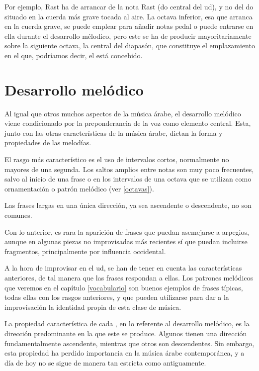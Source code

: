 Por ejemplo, \maqam Rast ha de arrancar de la nota Rast (do central del ud), y no del do situado en la cuerda más grave tocada al aire. La octava inferior, esa que arranca en la cuerda grave, se puede emplear para añadir notas pedal o puede entrarse en ella durante el desarrollo mélodico, pero este se ha de producir mayoritariamente sobre la siguiente octava, la central del diapasón, que constituye el emplazamiento en el que, podríamos decir, el \maqam está concebido.

\section{Desarrollo melódico}
\label{desarrollo_melodico}

Al igual que otros muchos aspectos de la música árabe, el desarrollo melódico viene condicionado por la preponderancia de la voz como elemento central. Esta, junto con las otras características de la música árabe, dictan la forma y propiedades de las melodías.

El rasgo más característico es el uso de intervalos cortos, normalmente no mayores de una segunda. Los saltos amplios entre notas son muy poco frecuentes, salvo al inicio de una frase o en los intervalos de una octava que se utilizan como ornamentación o patrón melódico (ver \ref{octavas}).

Las frases largas en una única dirección, ya sea ascendente o descendente, no son comunes.

Con lo anterior, es rara la aparición de frases que puedan asemejarse a arpegios, aunque en algunas piezas no improvisadas más recientes sí que puedan incluirse fragmentos, principalmente por influencia occidental.

A la hora de improvisar en el ud, se han de tener en cuenta las características anteriores, de tal manera que las frases respondan a ellas. Los patrones melódicos que veremos en el capítulo \ref{vocabulario} son buenos ejemplos de frases típicas, todas ellas con los rasgos anteriores, y que pueden utilizarse para dar a la improvisación la identidad propia de esta clase de música.

La propiedad característica de cada \maqamb, en lo referente al desarrollo melódico, es la dirección predominante en la que este se produce. Algunos \maqamaat tienen una dirección fundamentalmente ascendente, mientras que otros son descendentes. Sin embargo, esta propiedad ha perdido importancia en la música árabe contemporánea, y a día de hoy no se sigue de manera tan estricta como antiguamente.


